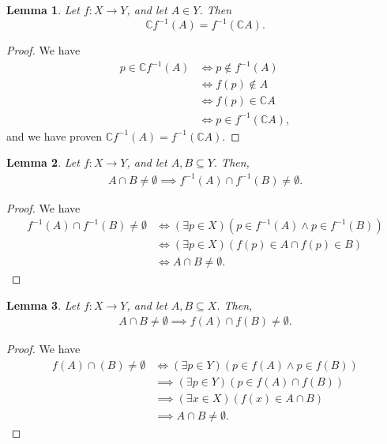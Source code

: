 \documentclass[10pt,a4paper]{article}
\theoremstyle{theorem}
\newtheorem{lemma}{Lemma}
\theoremstyle{definition}
\begin{document}
\begin{lemma}
Let $f:X \to Y$, and let $A \in Y$. Then
\begin{equation*}
\mathbb{C}f^{-1}(A) = f^{-1}(\mathbb{C}A).
\end{equation*}
\end{lemma}

\begin{proof}
We have 
\begin{align*}
p \in \mathbb{C}f^{-1}(A) &\iff p \not \in f^{-1}(A)\\
&\iff f(p) \not \in A\\
&\iff f(p) \in \mathbb{C}A\\
&\iff p \in f^{-1}(\mathbb{C}A),
\end{align*}
and we have proven $\mathbb{C}f^{-1}(A) = f^{-1}(\mathbb{C}A)$.
\end{proof}

\begin{lemma}
Let $f:X \to Y$, and let $A,B \subseteq Y$. Then,
\begin{align*}
A \cap B \not = \emptyset \implies f^{-1}(A) \cap f^{-1}(B) \not = \emptyset.
\end{align*}
\end{lemma}

\begin{proof}
We have
\begin{align*}
f^{-1}(A) \cap f^{-1}(B) \not = \emptyset &\iff (\exists p \in X)(p \in f^{-1}(A) \land p\in f^{-1}(B))\\
&\iff (\exists p \in X)(f(p) \in A \cap f(p) \in B)\\
&\iff A \cap B \not = \emptyset.
\end{align*}
\end{proof}

\begin{lemma}
Let $f:X \to Y$, and let $A,B \subseteq X$. Then,
\begin{align*}
A \cap B \not = \emptyset \implies f(A) \cap f(B) \not = \emptyset.
\end{align*}
\end{lemma}

\begin{proof}
We have
\begin{align*}
f(A) \cap (B) \not = \emptyset &\iff (\exists p \in Y)(p \in f(A) \land p\in f(B))\\
&\implies (\exists p \in Y)(p \in f(A) \cap f(B))\\
&\implies (\exists x \in X)(f(x) \in A \cap B)\\
&\implies A \cap B \not = \emptyset.
\end{align*}
\end{proof}
\end{document}
